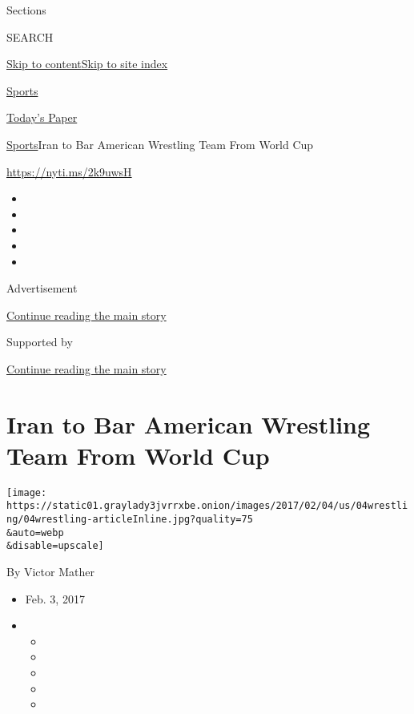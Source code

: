 Sections

SEARCH

\protect\hyperlink{site-content}{Skip to
content}\protect\hyperlink{site-index}{Skip to site index}

\href{https://www.nytimes3xbfgragh.onion/section/sports}{Sports}

\href{https://myaccount.nytimes3xbfgragh.onion/auth/login?response_type=cookie\&client_id=vi}{}

\href{https://www.nytimes3xbfgragh.onion/section/todayspaper}{Today's
Paper}

\href{/section/sports}{Sports}\textbar{}Iran to Bar American Wrestling
Team From World Cup

\url{https://nyti.ms/2k9uwsH}

\begin{itemize}
\item
\item
\item
\item
\item
\end{itemize}

Advertisement

\protect\hyperlink{after-top}{Continue reading the main story}

Supported by

\protect\hyperlink{after-sponsor}{Continue reading the main story}

\hypertarget{iran-to-bar-american-wrestling-team-from-world-cup}{%
\section{Iran to Bar American Wrestling Team From World
Cup}\label{iran-to-bar-american-wrestling-team-from-world-cup}}

\texttt{[image: https://static01.graylady3jvrrxbe.onion/images/2017/02/04/us/04wrestling/04wrestling-articleInline.jpg?quality=75\\\&auto=webp\\\&disable=upscale]}

By Victor Mather

\begin{itemize}
\item
  Feb. 3, 2017
\item
  \begin{itemize}
  \item
  \item
  \item
  \item
  \item
  \end{itemize}
\end{itemize}


